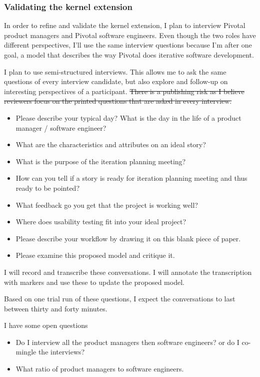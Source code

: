 \documentclass[preprint,12pt,3p]{elsarticle}
\begin{document}
\subsubsection{Validating the kernel extension}

In order to refine and validate the kernel extension, I plan to interview Pivotal product managers and Pivotal software engineers. Even though the two roles have different perspectives, I'll use the same interview questions because I'm after one goal, a model that describes the way Pivotal does iterative software development.

I plan to use semi-structured interviews. This allows me to ask the same questions of every interview candidate, but also explore and follow-up on interesting perspectives of a participant. \sout{There is a publishing risk as I believe reviewers focus on the printed questions that are asked in every interview.}

\begin{itemize}
\item Please describe your typical day? What is the day in the life of a product manager / software engineer?
\item What are the characteristics and attributes on an ideal story?
\item What is the purpose of the iteration planning meeting?
\item How can you tell if a story is ready for iteration planning meeting and thus ready to be pointed?
\item What feedback go you get that the project is working well?
\item Where does usability testing fit into your ideal project?
\item Please describe your workflow by drawing it on this blank piece of paper.
\item Please examine this proposed model and critique it.
\end{itemize}

I will record and transcribe these conversations. I will annotate the transcription with markers and use these to update the proposed model.

Based on one trial run of these questions, I expect the conversations to last between thirty and forty minutes. 

I have some open questions
\begin{itemize}
\item Do I interview all the product managers then software engineers? or do I co-mingle the interviews?
\item What ratio of product managers to software engineers.
\end{itemize}
\end{document}
